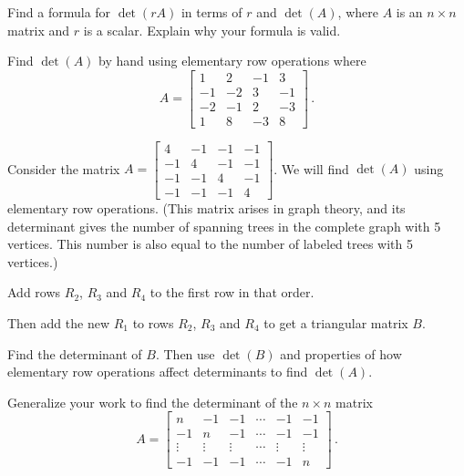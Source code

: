 
\be
\item \label{ex:4_f_det_multiple} Find a formula for $\det(rA)$ in terms of $r$ and $\det(A)$, where $A$ is an $n\times n$ matrix and $r$ is a scalar. Explain why your formula is valid.

\item Find $\det(A)$ by hand using elementary row operations where
\[ A= \left[ \begin{array}{rrrr} 1&2&-1&3\\ -1&-2&3&-1\\ -2&-1&2&-3\\ 1&8&-3&8 \end{array} \right] \, .\]

\item Consider the matrix $A= \left[ \begin{array}{rrrr} 4&-1&-1&-1 \\ -1&4&-1&-1\\ -1&-1&4&-1\\ -1&-1&-1&4 \end{array} \right]$. We will find $\det(A)$ using elementary row operations. (This matrix arises in graph theory, and its determinant gives the number of spanning trees in the complete graph with 5 vertices. This number is also equal to the number of labeled trees with 5 vertices.)

\ba 
\item Add rows $R_2$, $R_3$ and $R_4$ to the first row in that order.



\item Then add the new $R_1$ to rows $R_2$, $R_3$ and $R_4$ to get a triangular matrix $B$.


\item Find the determinant of $B$. Then use $\det(B)$ and properties of how elementary row operations affect determinants to find $\det(A)$.



\item Generalize your work to find the determinant of the $n\times n$ matrix
\[ A= \left[ \begin{array}{rrrrrr} n&-1&-1&\cdots &-1&-1 \\ -1&n&-1&\cdots &-1&-1\\ \vdots &\vdots &\vdots &\cdots & \vdots & \vdots\\ -1&-1&-1& \cdots&-1&n \end{array} \right] \, .\]

